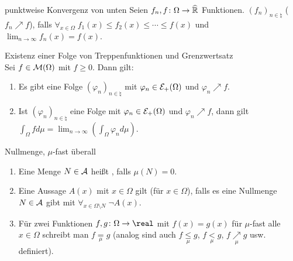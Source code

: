 \linie

\begin{Def}{punktweise Konvergenz von unten}
    Seien $f_n, f\colon \Omega \rightarrow \widehat{\mathbb{R}}$ Funktionen.
    $(f_n)_{n \in \natural}$ 
    ($f_n \nearrow f$), falls $\forall_{x \in \Omega}\; f_1(x) \le f_2(x) \le \dotsb \le f(x)$
    und\\
    $\lim_{n \to \infty} f_n(x) = f(x)$.
\end{Def}

\begin{Satz}{Existenz einer Folge von Treppenfunktionen und Grenzwertsatz}\\
    Sei $f \in \mathcal{M}(\Omega)$ mit $f \ge 0$.
    Dann gilt:
    \begin{enumerate}
        \item
        Es gibt eine Folge $(\varphi_n)_{n \in \natural}$ mit $\varphi_n \in \mathcal{E}_+(\Omega)$ und
        $\varphi_n \nearrow f$.
        
        \item
        Ist $(\varphi_n)_{n \in \natural}$ eine Folge mit $\varphi_n \in \mathcal{E}_+(\Omega)$ und
        $\varphi_n \nearrow f$, dann gilt\\
        $\int_\Omega f d\mu = \lim_{n \to \infty} \left(\int_\Omega \varphi_n d\mu\right)$.
    \end{enumerate}
\end{Satz}

\linie

\begin{Def}{Nullmenge, $\mu$-fast überall}
    \begin{enumerate}
        \item
        Eine Menge $N \in \mathcal{A}$ heißt , falls $\mu(N) = 0$.
        
        \item
        Eine Aussage $A(x)$ mit $x \in \Omega$ gilt 
        (für  $x \in \Omega$), falls es eine Nullmenge $N \in \mathcal{A}$ gibt
        mit $\forall_{x \in \Omega \setminus N}\; \lnot A(x)$.
        
        \item
        Für zwei Funktionen $f, g\colon \Omega \rightarrow \real$ mit
        $f(x) = g(x)$ für $\mu$-fast alle $x \in \Omega$ schreibt man
        $f \underset{\mu}{=} g$
        (analog sind auch $f \underset{\mu}{\le} g$, $f \underset{\mu}{<} g$,
        $f \underset{\mu}{\nearrow} g$ usw. definiert).
    \end{enumerate}
\end{Def}

